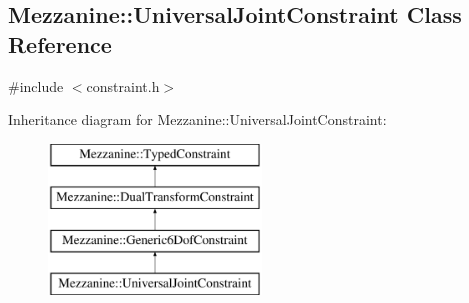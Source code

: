 \hypertarget{classMezzanine_1_1UniversalJointConstraint}{
\subsection{Mezzanine::UniversalJointConstraint Class Reference}
\label{classMezzanine_1_1UniversalJointConstraint}
}


{\ttfamily \#include $<$constraint.h$>$}

Inheritance diagram for Mezzanine::UniversalJointConstraint:\begin{figure}[H]
\begin{center}
\leavevmode
\includegraphics[height=4.000000cm]{classMezzanine_1_1UniversalJointConstraint}
\end{center}
\end{figure}
